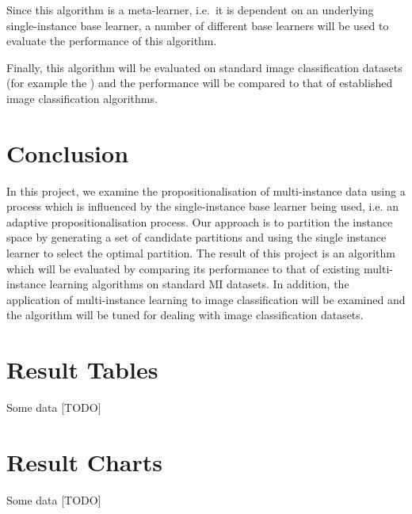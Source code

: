 \documentclass[a4paper,12pt]{report} %
\begin{document}
Since this algorithm is a meta-learner, 
    i.e.\ it is dependent on an underlying single-instance base learner, 
    a number of different base learners will be 
    used to evaluate the performance of this algorithm.
 
Finally, this algorithm will be evaluated on 
    standard image classification datasets 
    (for example the ) and 
    the performance will be compared to that of 
    established image classification algorithms.

\chapter{Conclusion}
In this project, 
    we examine the propositionalisation of multi-instance data using 
    a process which is influenced by the single-instance base learner being used, 
    i.e. an adaptive propositionalisation process. 
Our approach is to partition the instance space 
    by generating a set of candidate partitions and 
    using the single instance learner to select the optimal partition. 
The result of this project is an algorithm
    which will be evaluated by comparing its performance to 
    that of existing multi-instance learning algorithms on standard MI datasets. 
In addition, 
    the application of multi-instance learning 
    to image classification will be examined and 
    the algorithm will be tuned for dealing with image classification datasets.
\clearpage

\appendix
\chapter{Result Tables}
Some data [TODO]
\chapter{Result Charts}
Some data [TODO]
 

\end{document}

